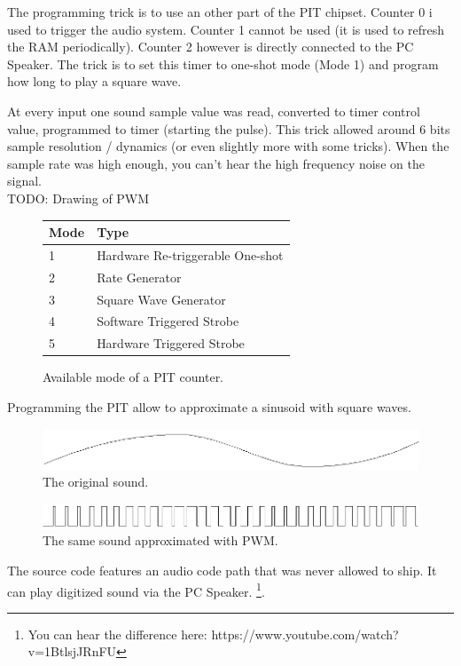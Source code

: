   \par
The programming trick is to use an other part of the PIT chipset. Counter 0 i used to trigger the audio system. Counter 1 cannot be used (it is used to refresh the RAM periodically). Counter 2 however is directly connected to the PC Speaker. The trick is to set this timer to one-shot mode (Mode 1) and program how long to play a square wave. \\
\par At every input one sound sample value was read, converted to timer control value, programmed to timer (starting the pulse). This trick allowed around 6 bits sample resolution / dynamics (or even slightly more with some tricks). When the sample rate was high enough, you can’t hear the high frequency noise on the signal.\\
TODO: Drawing of PWM
\par
\begin{figure}[H]
\centering
\begin{tabularx}{\textwidth}{ X X  }
  \toprule
  \textbf{Mode} & \textbf{Type} \\ \bottomrule
1 & Hardware Re-triggerable One-shot\\
2 & Rate Generator\\
3 & Square Wave Generator\\
4 & Software Triggered Strobe\\
5 & Hardware Triggered Strobe\\
\bottomrule
\end{tabularx}
\caption{Available mode of a PIT counter.}
\end{figure}
Programming the PIT allow to approximate a sinusoid with square waves.
\par
\begin{figure}[H]
\centering
 \includegraphics[width=\textwidth]{imgs/drawings/pwm/sinuois.png}
 \caption{The original sound.}
 \end{figure}
\par

\par
\begin{figure}[H]
\centering
 \includegraphics[width=\textwidth]{imgs/drawings/pwm/pwm_approximation.png}
 \caption{The same sound approximated with PWM.}
 \end{figure}
\par


 The source code features an audio code path that was never allowed to ship. It can play digitized sound via the PC Speaker.
\footnote{You can hear the difference here: https://www.youtube.com/watch?v=1BtlsjJRnFU}.\\
\par
{}





















